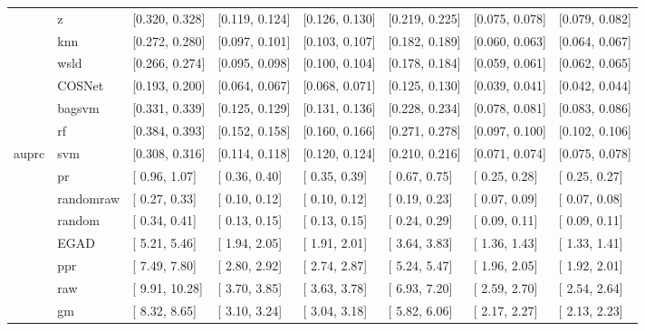 \begin{table}[H]
{\begin{tabular}{llllllll}
 & z & [0.320, 0.328] & [0.119, 0.124] & [0.126, 0.130] & [0.219, 0.225] & [0.075, 0.078] & [0.079, 0.082]\\

 & knn & [0.272, 0.280] & [0.097, 0.101] & [0.103, 0.107] & [0.182, 0.189] & [0.060, 0.063] & [0.064, 0.067]\\

 & wsld & [0.266, 0.274] & [0.095, 0.098] & [0.100, 0.104] & [0.178, 0.184] & [0.059, 0.061] & [0.062, 0.065]\\

 & COSNet & [0.193, 0.200] & [0.064, 0.067] & [0.068, 0.071] & [0.125, 0.130] & [0.039, 0.041] & [0.042, 0.044]\\

 & bagsvm & [0.331, 0.339] & [0.125, 0.129] & [0.131, 0.136] & [0.228, 0.234] & [0.078, 0.081] & [0.083, 0.086]\\

 & rf & [0.384, 0.393] & [0.152, 0.158] & [0.160, 0.166] & [0.271, 0.278] & [0.097, 0.100] & [0.102, 0.106]\\

\multirow{-15}{*}{\raggedright\arraybackslash auprc} & svm & [0.308, 0.316] & [0.114, 0.118] & [0.120, 0.124] & [0.210, 0.216] & [0.071, 0.074] & [0.075, 0.078]\\
\cmidrule{1-8}
 & pr & [ 0.96,  1.07] & [ 0.36,  0.40] & [ 0.35,  0.39] & [ 0.67,  0.75] & [ 0.25,  0.28] & [ 0.25,  0.27]\\

 & randomraw & [ 0.27,  0.33] & [ 0.10,  0.12] & [ 0.10,  0.12] & [ 0.19,  0.23] & [ 0.07,  0.09] & [ 0.07,  0.08]\\

 & random & [ 0.34,  0.41] & [ 0.13,  0.15] & [ 0.13,  0.15] & [ 0.24,  0.29] & [ 0.09,  0.11] & [ 0.09,  0.11]\\

 & EGAD & [ 5.21,  5.46] & [ 1.94,  2.05] & [ 1.91,  2.01] & [ 3.64,  3.83] & [ 1.36,  1.43] & [ 1.33,  1.41]\\

 & ppr & [ 7.49,  7.80] & [ 2.80,  2.92] & [ 2.74,  2.87] & [ 5.24,  5.47] & [ 1.96,  2.05] & [ 1.92,  2.01]\\

 & raw & [ 9.91, 10.28] & [ 3.70,  3.85] & [ 3.63,  3.78] & [ 6.93,  7.20] & [ 2.59,  2.70] & [ 2.54,  2.64]\\

 & gm & [ 8.32,  8.65] & [ 3.10,  3.24] & [ 3.04,  3.18] & [ 5.82,  6.06] & [ 2.17,  2.27] & [ 2.13,  2.23]\\


\end{tabular}}
\end{table}
